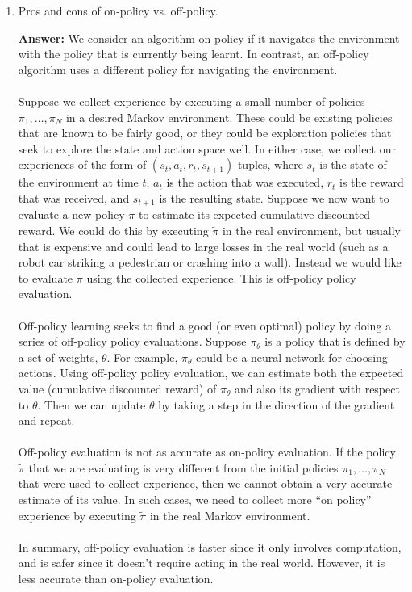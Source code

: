 \documentclass{article}
\newenvironment{QandA}{\begin{enumerate}[label=\arabic*.]}{\end{enumerate}}
\newenvironment{answer}{\par\normalfont \textbf{Answer:}}{}
\begin{document}
\begin{QandA}
    \item Pros and cons of on-policy vs. off-policy.
    \begin{answer}
        We consider an algorithm on-policy if it navigates the environment with the policy that is currently being learnt. In contrast, an off-policy algorithm uses a different policy for navigating the environment. \\\\
        Suppose we collect experience by executing a small number of policies $\pi_1, \ldots, \pi_N$ in a desired Markov environment. These could be existing policies that are known to be fairly good, or they could be exploration policies that seek to explore the state and action space well. In either case, we collect our experiences of the form of $(s_t, a_t, r_t, s_{t+1})$ tuples, where $s_t$ is the state of the environment at time $t$, $a_t$ is the action that was executed, $r_t$ is the reward that was received, and $s_{t+1}$ is the resulting state. Suppose we now want to evaluate a new policy $\tilde{\pi}$ to estimate its expected cumulative discounted reward. We could do this by executing $\tilde{\pi}$ in the real environment, but usually that is expensive and could lead to large losses in the real world (such as a robot car striking a pedestrian or crashing into a wall). Instead we would like to evaluate $\tilde{\pi}$ using the collected experience. This is off-policy policy evaluation.\\\\
        Off-policy learning seeks to find a good (or even optimal) policy by doing a series of off-policy policy evaluations. Suppose $\pi_\theta$ is a policy that is defined by a set of weights, $\theta$. For example, $\pi_\theta$ could be a neural network for choosing actions. Using off-policy policy evaluation, we can estimate both the expected value (cumulative discounted reward) of $\pi_\theta$ and also its gradient with respect to $\theta$. Then we can update $\theta$ by taking a step in the direction of the gradient and repeat. \\\\
        Off-policy evaluation is not as accurate as on-policy evaluation. If the policy $\tilde{\pi}$ that we are evaluating is very different from the initial policies $\pi_1, \ldots, \pi_N$ that were used to collect experience, then we cannot obtain a very accurate estimate of its value. In such cases, we need to collect more “on policy” experience by executing $\tilde{\pi}$ in the real Markov environment.\\\\
        In summary, off-policy evaluation is faster since it only involves computation, and is safer since it doesn't require acting in the real world. However, it is less accurate than on-policy evaluation.


\end{answer}
\end{QandA}
\end{document}
